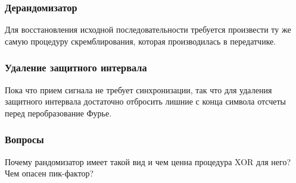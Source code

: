 \subsubsection*{Дерандомизатор}

Для восстановления исходной последовательности требуется произвести ту же самую процедуру скремблирования, которая производилась в передатчике. 

\subsubsection*{Удаление защитного интервала}
Пока что прием сигнала не требует синхронизации, так что для удаления защитного интервала достаточно отбросить лишние с конца символа отсчеты перед перобразование Фурье.

\subsubsection {Вопросы}
Почему рандомизатор имеет такой вид и чем ценна процедура XOR для него?
Чем опасен пик-фактор?